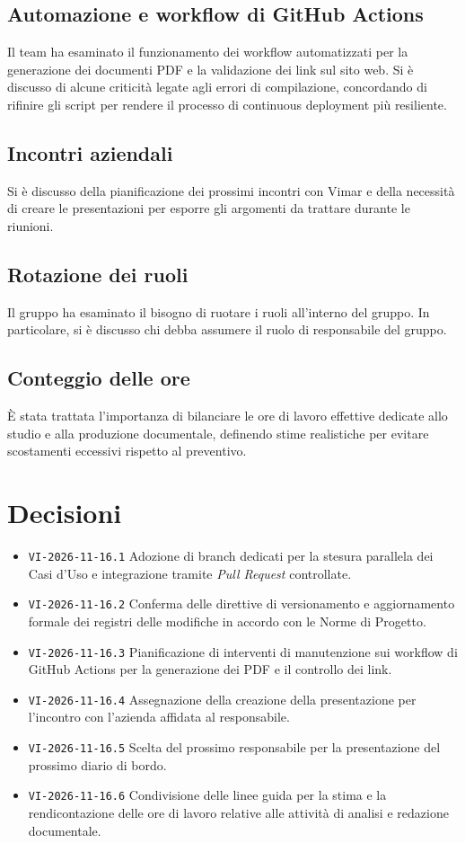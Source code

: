 \documentclass[11pt, a4paper]{article}
\begin{document}
\subsection{Automazione e workflow di GitHub Actions}
Il team ha esaminato il funzionamento dei workflow automatizzati per la generazione dei documenti PDF e la validazione dei link sul sito web. Si è discusso di alcune criticità legate agli errori di compilazione, concordando di rifinire gli script per rendere il processo di continuous deployment più resiliente.

\subsection{Incontri aziendali}
Si è discusso della pianificazione dei prossimi incontri con Vimar e della necessità di creare le presentazioni per esporre gli argomenti da trattare durante le riunioni. 

\subsection{Rotazione dei ruoli}
Il gruppo ha esaminato il bisogno di ruotare i ruoli all'interno del gruppo. In particolare, si è discusso chi debba assumere il ruolo di responsabile del gruppo.

\subsection{Conteggio delle ore}
È stata trattata l'importanza di bilanciare le ore di lavoro effettive dedicate allo studio e alla produzione documentale, definendo stime realistiche per evitare scostamenti eccessivi rispetto al preventivo.

\newpage

\section{Decisioni}
\begin{itemize}
    \item \texttt{VI-2026-11-16.1} Adozione di branch dedicati per la stesura parallela dei Casi d'Uso e integrazione tramite \textit{Pull Request} controllate.
    \item \texttt{VI-2026-11-16.2} Conferma delle direttive di versionamento e aggiornamento formale dei registri delle modifiche in accordo con le Norme di Progetto.
    \item \texttt{VI-2026-11-16.3} Pianificazione di interventi di manutenzione sui workflow di GitHub Actions per la generazione dei PDF e il controllo dei link.
    \item \texttt{VI-2026-11-16.4} Assegnazione della creazione della presentazione per l'incontro con l'azienda affidata al responsabile.
    \item \texttt{VI-2026-11-16.5} Scelta del prossimo responsabile per la presentazione del prossimo diario di bordo.
    \item \texttt{VI-2026-11-16.6} Condivisione delle linee guida per la stima e la rendicontazione delle ore di lavoro relative alle attività di analisi e redazione documentale.
\end{itemize}
\end{document}
